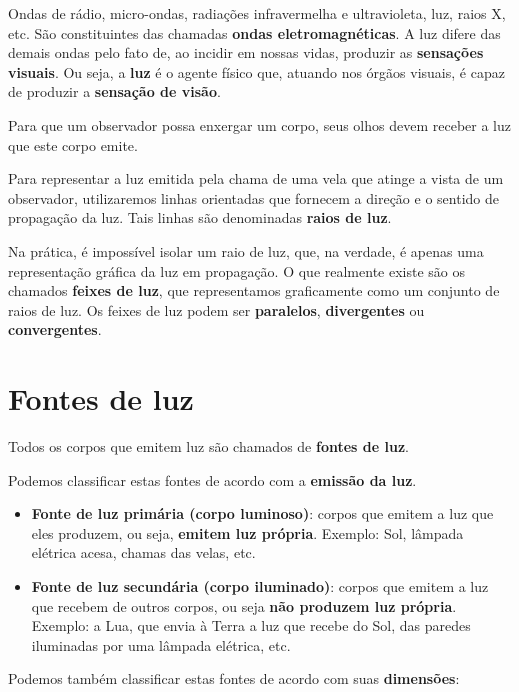 \documentclass[11pt,twocolumn,oneside]{article}
\begin{document}
Ondas de rádio, micro-ondas, radiações infravermelha e ultravioleta, luz, raios X, etc. São constituintes das chamadas \textbf{ondas eletromagnéticas}. A luz difere das demais ondas pelo fato de, ao incidir em nossas vidas, produzir as \textbf{sensações visuais}. Ou seja, a \textbf{luz} é o agente físico que, atuando nos órgãos visuais, é capaz de produzir a \textbf{sensação de visão}.


Para que um observador possa enxergar um corpo, seus olhos devem receber a luz que este corpo emite.


Para representar a luz emitida pela chama de uma vela que atinge a vista de um observador, utilizaremos linhas orientadas que fornecem a direção e o sentido de propagação da luz. Tais linhas são denominadas \textbf{raios de luz}.


Na prática, é impossível isolar um raio de luz, que, na verdade, é apenas uma representação gráfica da luz em propagação. O que realmente existe são os chamados \textbf{feixes de luz}, que representamos graficamente como um conjunto de raios de luz. Os feixes de luz podem ser \textbf{paralelos}, \textbf{divergentes} ou \textbf{convergentes}.


\hypertarget{x-fontes-de-luz}{\section{Fontes de luz}}
Todos os corpos que emitem luz são chamados de \textbf{fontes de luz}.


Podemos classificar estas fontes de acordo com a \textbf{emissão da luz}.


\begin{itemize}

\item \textbf{Fonte de luz primária (corpo luminoso)}: corpos que emitem a luz que eles produzem, ou seja, \textbf{emitem luz própria}. Exemplo: Sol, lâmpada elétrica acesa, chamas das velas, etc.

\item \textbf{Fonte de luz secundária (corpo iluminado)}: corpos que emitem a luz que recebem de outros corpos, ou seja \textbf{não produzem luz própria}. Exemplo: a Lua, que envia à Terra a luz que recebe do Sol, das paredes iluminadas por uma lâmpada elétrica, etc.

\end{itemize}


Podemos também classificar estas fontes de acordo com suas \textbf{dimensões}:
\end{document}
